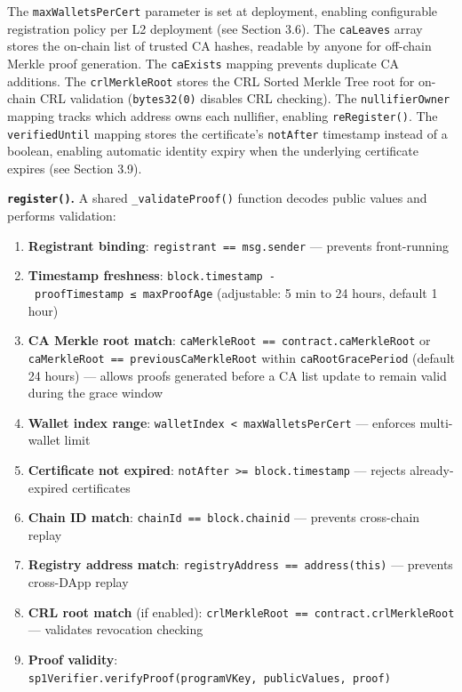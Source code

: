 \documentclass[11pt, a4paper]{article}
\providecommand{\tightlist}{%
  \setlength{\itemsep}{0pt}\setlength{\parskip}{0pt}}
\begin{document}
The \texttt{maxWalletsPerCert} parameter is set at deployment, enabling
configurable registration policy per L2 deployment (see Section 3.6).
The \texttt{caLeaves} array stores the on-chain list of trusted CA
hashes, readable by anyone for off-chain Merkle proof generation. The
\texttt{caExists} mapping prevents duplicate CA additions. The
\texttt{crlMerkleRoot} stores the CRL Sorted Merkle Tree root for
on-chain CRL validation (\texttt{bytes32(0)} disables CRL checking). The
\texttt{nullifierOwner} mapping tracks which address owns each
nullifier, enabling \texttt{reRegister()}. The \texttt{verifiedUntil}
mapping stores the certificate's \texttt{notAfter} timestamp instead of
a boolean, enabling automatic identity expiry when the underlying
certificate expires (see Section 3.9).

\textbf{\texttt{register()}.} A shared \texttt{\_validateProof()}
function decodes public values and performs validation:

\begin{enumerate}
\def\labelenumi{\arabic{enumi}.}
\tightlist
\item
  \textbf{Registrant binding}: \texttt{registrant\ ==\ msg.sender} ---
  prevents front-running
\item
  \textbf{Timestamp freshness}:
  \texttt{block.timestamp\ -\ proofTimestamp\ ≤\ maxProofAge}
  (adjustable: 5 min to 24 hours, default 1 hour)
\item
  \textbf{CA Merkle root match}:
  \texttt{caMerkleRoot\ ==\ contract.caMerkleRoot} or
  \texttt{caMerkleRoot\ ==\ previousCaMerkleRoot} within
  \texttt{caRootGracePeriod} (default 24 hours) --- allows proofs
  generated before a CA list update to remain valid during the grace
  window
\item
  \textbf{Wallet index range}:
  \texttt{walletIndex\ \textless{}\ maxWalletsPerCert} --- enforces
  multi-wallet limit
\item
  \textbf{Certificate not expired}:
  \texttt{notAfter\ \textgreater{}=\ block.timestamp} --- rejects
  already-expired certificates
\item
  \textbf{Chain ID match}: \texttt{chainId\ ==\ block.chainid} ---
  prevents cross-chain replay
\item
  \textbf{Registry address match}:
  \texttt{registryAddress\ ==\ address(this)} --- prevents cross-DApp
  replay
\item
  \textbf{CRL root match} (if enabled):
  \texttt{crlMerkleRoot\ ==\ contract.crlMerkleRoot} --- validates
  revocation checking
\item
  \textbf{Proof validity}:
  \texttt{sp1Verifier.verifyProof(programVKey,\ publicValues,\ proof)}
\end{enumerate}
\end{document}
